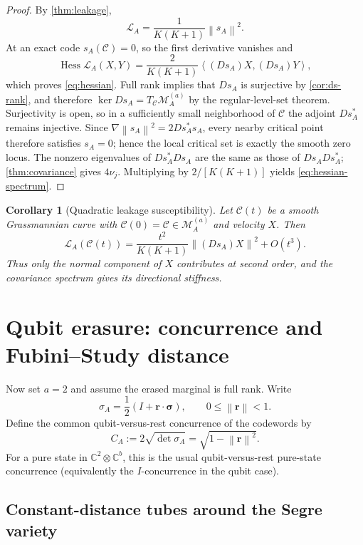 \documentclass[11pt]{article}
\newtheorem{corollary}[theorem]{Corollary}
\theoremstyle{definition}
\newcommand{\cC}{\mathcal C}
\newcommand{\cM}{\mathcal M}
\newcommand{\cL}{\mathcal L}
\newcommand{\C}{\mathbb C}
\newcommand{\1}{\mathbf 1}
\newcommand{\norm}[1]{\left\lVert #1\right\rVert}
\newcommand{\inner}[2]{\left\langle #1,#2\right\rangle}
\begin{document}
\begin{proof}
By \cref{thm:leakage},
\[
\cL_A=\frac{1}{K(K+1)}\norm{s_A}^2.
\]
At an exact code $s_A(\cC)=0$, so the first derivative vanishes and
\[
\operatorname{Hess}\cL_A(X,Y)
=\frac{2}{K(K+1)}\inner{(Ds_A)X}{(Ds_A)Y},
\]
which proves \eqref{eq:hessian}.  Full rank implies that $Ds_A$ is surjective by \cref{cor:ds-rank}, and therefore $\ker Ds_A=T_{\cC}\cM_A^{(a)}$ by the regular-level-set theorem.  Surjectivity is open, so in a sufficiently small neighborhood of $\cC$ the adjoint $Ds_A^*$ remains injective.  Since $\nabla\norm{s_A}^2=2Ds_A^*s_A$, every nearby critical point therefore satisfies $s_A=0$; hence the local critical set is exactly the smooth zero locus.  The nonzero eigenvalues of $Ds_A^*Ds_A$ are the same as those of $Ds_A Ds_A^*$; \cref{thm:covariance} gives $4\nu_j$.  Multiplying by $2/[K(K+1)]$ yields \eqref{eq:hessian-spectrum}.
\end{proof}

\begin{corollary}[Quadratic leakage susceptibility]
Let $\cC(t)$ be a smooth Grassmannian curve with $\cC(0)=\cC\in\cM_A^{(a)}$ and velocity $X$.  Then
\begin{equation}
\cL_A(\cC(t))
=
\frac{t^2}{K(K+1)}\norm{(Ds_A)X}^2+O(t^3).
\label{eq:quadratic-leakage}
\end{equation}
Thus only the normal component of $X$ contributes at second order, and the covariance spectrum gives its directional stiffness.
\end{corollary}

\section{Qubit erasure: concurrence and Fubini--Study distance}
\label{sec:qubit}

Now set $a=2$ and assume the erased marginal is full rank.  Write
\[
\sigma_A=\frac12(I+\bm r\cdot\bm\sigma),
\qquad 0\le \norm{\bm r}<1.
\]
Define the common qubit-versus-rest concurrence of the codewords by
\begin{equation}
C_A:=2\sqrt{\det\sigma_A}=\sqrt{1-\norm{\bm r}^2}.
\label{eq:concurrence}
\end{equation}
For a pure state in $\C^2\otimes\C^b$, this is the usual qubit-versus-rest pure-state concurrence (equivalently the $I$-concurrence in the qubit case).

\subsection{Constant-distance tubes around the Segre variety}
\end{document}
